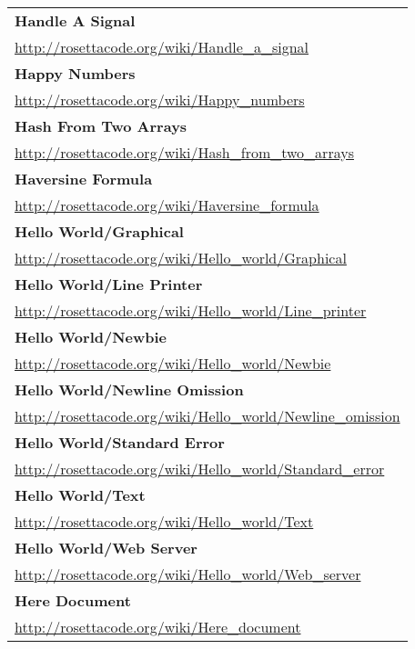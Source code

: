 \begin{longtable}{l}
\textbf{Handle A Signal } \\ \href{http://rosettacode.org/wiki/Handle\_a\_signal}{http://rosettacode.org/wiki/Handle\_a\_signal} \\
\textbf{
Happy Numbers } \\ \href{http://rosettacode.org/wiki/Happy\_numbers}{http://rosettacode.org/wiki/Happy\_numbers} \\
\textbf{Hash From Two Arrays } \\ \href{http://rosettacode.org/wiki/Hash\_from\_two\_arrays}{http://rosettacode.org/wiki/Hash\_from\_two\_arrays} \\
\textbf{Haversine Formula } \\ \href{http://rosettacode.org/wiki/Haversine\_formula}{http://rosettacode.org/wiki/Haversine\_formula} \\
\textbf{
Hello World/Graphical } \\ \href{http://rosettacode.org/wiki/Hello\_world/Graphical}{http://rosettacode.org/wiki/Hello\_world/Graphical} \\
\textbf{Hello World/Line Printer } \\ \href{http://rosettacode.org/wiki/Hello\_world/Line\_printer}{http://rosettacode.org/wiki/Hello\_world/Line\_printer} \\
\textbf{
Hello World/Newbie } \\ \href{http://rosettacode.org/wiki/Hello\_world/Newbie}{http://rosettacode.org/wiki/Hello\_world/Newbie} \\
\textbf{Hello World/Newline Omission } \\ \href{http://rosettacode.org/wiki/Hello\_world/Newline\_omission}{http://rosettacode.org/wiki/Hello\_world/Newline\_omission} \\
\textbf{
Hello World/Standard Error } \\ \href{http://rosettacode.org/wiki/Hello\_world/Standard\_error}{http://rosettacode.org/wiki/Hello\_world/Standard\_error} \\
\textbf{Hello World/Text } \\ \href{http://rosettacode.org/wiki/Hello\_world/Text}{http://rosettacode.org/wiki/Hello\_world/Text} \\
\textbf{
Hello World/Web Server } \\ \href{http://rosettacode.org/wiki/Hello\_world/Web\_server}{http://rosettacode.org/wiki/Hello\_world/Web\_server} \\
\textbf{Here Document } \\ \href{http://rosettacode.org/wiki/Here\_document}{http://rosettacode.org/wiki/Here\_document} \\

\end{longtable}
